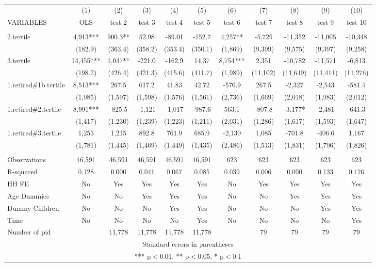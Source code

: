 \begin{tabular}{lcccccccccc} \hline
 & (1) & (2) & (3) & (4) & (5) & (6) & (7) & (8) & (9) & (10) \\
VARIABLES & OLS & test 2 & test 3 & test 4 & test 5 & test 6 & test 7 & test 8 & test 9 & test 10 \\ \hline
 &  &  &  &  &  &  &  &  &  &  \\
2.tertile & 4,913*** & 900.3** & 52.98 & -89.01 & -152.7 & 4,257** & -5,729 & -11,352 & -11,005 & -10,348 \\
 & (182.9) & (363.4) & (358.2) & (353.4) & (350.1) & (1,869) & (9,399) & (9,575) & (9,397) & (9,258) \\
3.tertile & 14,455*** & 1,047** & -221.0 & -162.9 & 14.37 & 8,754*** & 2,351 & -10,782 & -11,571 & -6,813 \\
 & (198.2) & (426.4) & (421.3) & (415.6) & (411.7) & (1,989) & (11,102) & (11,649) & (11,411) & (11,276) \\
1.retired\#1b.tertile & 8,513*** & 267.5 & 617.2 & 41.83 & 42.72 & -570.9 & 267.5 & -2,327 & -2,543 & -581.4 \\
 & (1,985) & (1,597) & (1,598) & (1,576) & (1,561) & (2,736) & (1,669) & (2,018) & (1,983) & (2,012) \\
1.retired\#2.tertile & 8,991*** & -825.5 & -1,121 & -1,017 & -987.6 & 563.1 & -807.8 & -3,177* & -2,481 & -641.3 \\
 & (1,417) & (1,230) & (1,239) & (1,223) & (1,211) & (2,031) & (1,286) & (1,617) & (1,593) & (1,647) \\
1.retired\#3.tertile & 1,253 & 1,215 & 892.8 & 761.9 & 685.9 & -2,130 & 1,085 & -701.8 & -406.6 & 1,167 \\
 & (1,781) & (1,445) & (1,469) & (1,449) & (1,435) & (2,486) & (1,513) & (1,831) & (1,796) & (1,826) \\
 &  &  &  &  &  &  &  &  &  &  \\
Observations & 46,591 & 46,591 & 46,591 & 46,591 & 46,591 & 623 & 623 & 623 & 623 & 623 \\
R-squared & 0.128 & 0.000 & 0.041 & 0.067 & 0.085 & 0.039 & 0.006 & 0.090 & 0.133 & 0.176 \\
HH FE & No & Yes & Yes & Yes & Yes & No & Yes & Yes & Yes & Yes \\
Age Dummies & No & No & Yes & Yes & Yes & No & No & Yes & Yes & Yes \\
Dummy Children & No & No & No & Yes & Yes & No & No & No & Yes & Yes \\
Time & No & No & No & No & Yes & No & No & No & No & Yes \\
 Number of pid &  & 11,778 & 11,778 & 11,778 & 11,778 &  & 79 & 79 & 79 & 79 \\ \hline
\multicolumn{11}{c}{ Standard errors in parentheses} \\
\multicolumn{11}{c}{ *** p$<$0.01, ** p$<$0.05, * p$<$0.1} \\
\end{tabular}
